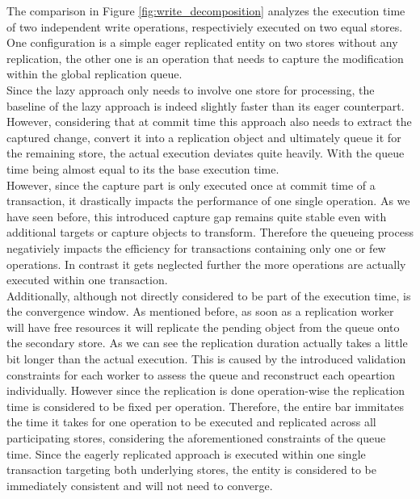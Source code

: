 The comparison in Figure \ref{fig:write_decomposition} analyzes the execution time of two independent write operations, respectiviely executed on two equal stores.
One configuration is a simple eager replicated entity on two stores without any replication, the other one is an operation that needs to capture 
the modification within the global replication queue.\\
Since the lazy approach only needs to involve one store for processing, the baseline of the lazy approach is indeed slightly faster than its eager counterpart.
However, considering that at commit time this approach also needs to extract the captured change, convert it into a replication object and ultimately queue 
it for the remaining store, the actual execution deviates quite heavily. With the queue time being almost equal to its the base execution time.\\
However, since the capture part is only executed once at commit time of a transaction, it drastically impacts the performance 
of one single operation.
As we have seen before, this introduced capture gap remains quite stable even with additional targets or capture objects to transform.
Therefore the queueing process negativiely impacts the efficiency for transactions containing only one or few operations.
In contrast it gets neglected further the more operations are actually executed within one transaction.\\
Additionally, although not directly considered to be part of the execution time, is the convergence window. As mentioned before, as soon
as a replication worker will have free resources it will replicate the pending object from the queue onto the secondary store.
As we can see the replication duration actually takes a little bit longer than the actual execution. This is caused by the introduced
validation constraints for each worker to assess the queue and reconstruct each opeartion individually. 
However since the replication is done operation-wise the replication time is considered to be fixed per operation.
Therefore, the entire bar immitates the time it takes for one operation to be executed and replicated across all participating stores,
considering the aforementioned constraints of the queue time.
Since the eagerly replicated approach is executed within one single transaction targeting both underlying stores, the entity is 
considered to be immediately consistent and will not need to converge. 






